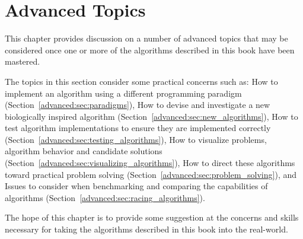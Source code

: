 

\renewcommand{\bibsection}{\subsection{\bibname}}
\chapter{Advanced Topics}
\label{ch:advanced}
This chapter provides discussion on a number of advanced topics that may be considered once one or more of the algorithms described in this book have been mastered.

The topics in this section consider some practical concerns such as: How to implement an algorithm using a different programming paradigm (Section~\ref{advanced:sec:paradigms}), How to devise and investigate a new biologically inspired algorithm (Section~\ref{advanced:sec:new_algorithms}), How to test algorithm implementations to ensure they are implemented correctly (Section~\ref{advanced:sec:testing_algorithms}), How to visualize problems, algorithm behavior and candidate solutions (Section~\ref{advanced:sec:visualizing_algorithms}), How to direct these algorithms toward practical problem solving (Section~\ref{advanced:sec:problem_solving}), and Issues to consider when benchmarking and comparing the capabilities of algorithms (Section~\ref{advanced:sec:racing_algorithms}).

The hope of this chapter is to provide some suggestion at the concerns and skills necessary for taking the algorithms described in this book into the real-world.

\newpage\begin{bibunit}\putbib\end{bibunit}
\newpage\begin{bibunit}\putbib\end{bibunit}
\newpage\begin{bibunit}\putbib\end{bibunit}
\newpage\begin{bibunit}\putbib\end{bibunit}
\newpage\begin{bibunit}\putbib\end{bibunit}
\newpage\begin{bibunit}\putbib\end{bibunit}

